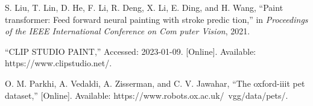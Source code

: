 \documentclass{mva_style}
\begin{document}
\begin{thebibliography}{99}
S. Liu, T. Lin, D. He, F. Li, R. Deng, X. Li, E. Ding, and H. Wang,
“Paint transformer: Feed forward neural painting with stroke predic
tion,” in \textit{Proceedings of the IEEE International Conference on Com
puter Vision}, 2021.


“CLIP STUDIO PAINT,” Accessed: 2023-01-09. [Online]. Available: https://www.clipstudio.net/.

O. M. Parkhi, A. Vedaldi, A. Zisserman, and C. V. Jawahar, “The
oxford-iiit pet dataset,” [Online]. Available: https://www.robots.ox.ac.uk/~vgg/data/pets/.

\end{thebibliography}
\end{document}
